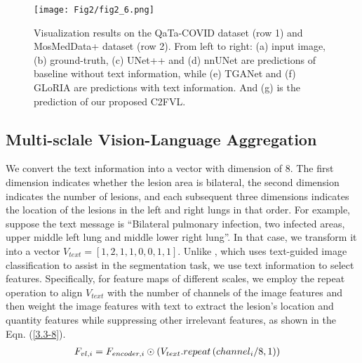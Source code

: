 \documentclass{article}
\begin{document}
\begin{figure*}[!ht]
{\begin{minipage}[t]{0.135\linewidth}
			\vspace{0.02cm}
			\texttt{[image: Fig2/fig2\_6.png]}\\
			\vspace{0.02cm}
		\end{minipage}%
	}
	\centering
	\caption{Visualization results on the QaTa-COVID dataset (row 1) and MosMedData+ dataset (row 2). From left to right: (a) input image, (b) ground-truth, (c) UNet++ and (d) nnUNet are predictions of baseline without text information, while (e) TGANet and (f) GLoRIA are predictions with text information. And (g) is the prediction of our proposed C2FVL.}
	\label{visfig}
	\vspace{-0.4cm}
	\label{vis}
\end{figure*}
\vspace{-4mm}
\subsection{Multi-sclale Vision-Language Aggregation}
\vspace{-2mm}
We convert the text information into a vector with dimension of 8. The first dimension indicates whether the lesion area is bilateral, the second dimension indicates the number of lesions, and each subsequent three dimensions indicates the location of the lesions in the left and right lungs in that order. For example, suppose the text message is ``Bilateral pulmonary infection, two infected areas, upper middle left lung and middle lower right lung''. In that case, we transform it into a vector $V_{text}=\left [1,2,1,1,0,0,1,1\right ]$. Unlike \cite{tomar2022tganet}, which uses text-guided image classification to assist in the segmentation task, we use text information to select features. Specifically, for feature maps of different scales, we employ the repeat operation to align $V_{text}$ with the number of channels of the image features and then weight the image features with text to extract the lesion's location and quantity features while suppressing other irrelevant features, as shown in the Eqn. (\ref{3.3-8}).
\vspace{-2mm}
\begin{eqnarray}
\setlength{\abovedisplayskip}{0pt}
\setlength{\belowdisplayskip}{0pt}
& F_{vl,i}= F_{encoder,i}\odot \left ( V_{text}.repeat\left (channel_{i}/8,1\right )\right )\label{3.3-8}
\end{eqnarray}
\end{document}
